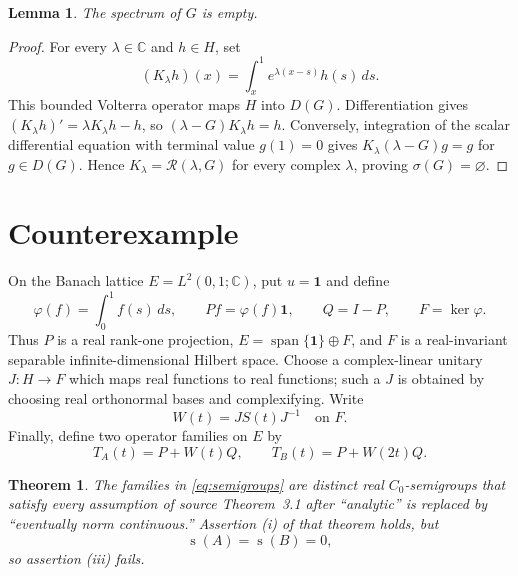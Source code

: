 \documentclass[11pt]{article}
\newtheorem{theorem}{Theorem}
\newtheorem{lemma}{Lemma}
\newcommand{\one}{\mathbf 1}
\newcommand{\C}{\mathbb C}
\newcommand{\R}{\mathcal R}
\newcommand{\spb}{\operatorname{s}}
\begin{document}
\begin{lemma}\label{lem:empty-spectrum}
The spectrum of $G$ is empty.
\end{lemma}

\begin{proof}
For every $\lambda\in\C$ and $h\in H$, set
\[
 (K_\lambda h)(x)=\int_x^1 e^{\lambda(x-s)}h(s)\,ds.
\]
This bounded Volterra operator maps $H$ into $D(G)$.  Differentiation gives
$(K_\lambda h)'=\lambda K_\lambda h-h$, so
$(\lambda-G)K_\lambda h=h$.  Conversely, integration of the scalar
differential equation with terminal value $g(1)=0$ gives
$K_\lambda(\lambda-G)g=g$ for $g\in D(G)$.  Hence
$K_\lambda=\R(\lambda,G)$ for every complex $\lambda$, proving
$\sigma(G)=\varnothing$.
\end{proof}

\section{Counterexample}

On the Banach lattice $E=L^2(0,1;\C)$, put $u=\one$ and define
\[
 \varphi(f)=\int_0^1 f(s)\,ds,
 \qquad Pf=\varphi(f)\one,
 \qquad Q=I-P,
 \qquad F=\ker\varphi.
\]
Thus $P$ is a real rank-one projection, $E=\operatorname{span}\{\one\}
\oplus F$, and $F$ is a real-invariant separable infinite-dimensional Hilbert
space.  Choose a complex-linear unitary $J:H\to F$ which maps real functions
to real functions; such a $J$ is obtained by choosing real orthonormal bases
and complexifying.  Write
\[
 W(t)=J S(t)J^{-1}\quad\text{on }F.
\]
Finally, define two operator families on $E$ by
\begin{equation}\label{eq:semigroups}
 T_A(t)=P+W(t)Q,
 \qquad
 T_B(t)=P+W(2t)Q.
\end{equation}

\begin{theorem}\label{thm:counterexample}
The families in \eqref{eq:semigroups} are distinct real $C_0$-semigroups that
satisfy every assumption of source Theorem~3.1 after ``analytic'' is replaced
by ``eventually norm continuous.''  Assertion \textup{(i)} of that theorem
holds, but
\[
 \spb(A)=\spb(B)=0,
\]
so assertion \textup{(iii)} fails.
\end{theorem}
\end{document}
